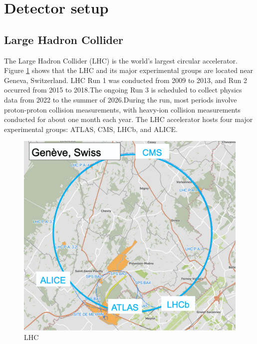 \newpage
\clearpage
\section{Detector setup}
    \subsection{Large Hadron Collider}
        The Large Hadron Collider (LHC) is the world's largest circular accelerator. Figure \ref{LHC} shows that the LHC and its major experimental groups are located near Geneva, Switzerland. LHC Run 1 was conducted from 2009 to 2013, and Run 2 occurred from 2015 to 2018.\@ The ongoing Run 3 is scheduled to collect physics data from 2022 to the summer of 2026.\@ During the run, most periods involve proton-proton collision measurements, with heavy-ion collision measurements conducted for about one month each year. The LHC accelerator hosts four major experimental groups: ATLAS, CMS, LHCb, and ALICE.\@
        \begin{figure}[htbp]
            \centering
            \includegraphics[keepaspectratio, scale=0.2]{fig/2_1_LHC_detecter.png}
            \caption{LHC}
            \label{LHC}
        \end{figure}
